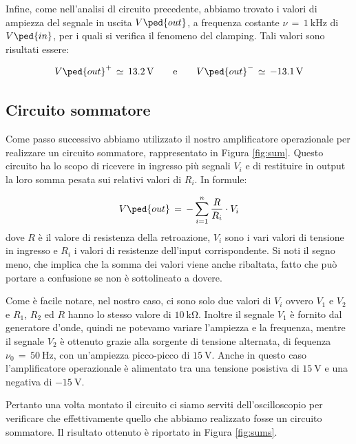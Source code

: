 Infine, come nell'analisi dl circuito precedente, abbiamo trovato i valori di ampiezza del segnale in uscita $V\ped{out}$, a frequenza costante $\nu\,=\,\SI{1}{\kilo\hertz}$ di $V\ped{in}$, per i quali si verifica il fenomeno del clamping. Tali valori sono risultati essere:

\begin{equation}
        V\ped{out}^+\,\simeq\,\SI{13.2}{\volt} \qquad \text{e} \qquad V\ped{out}^-\,\simeq\,\SI{-13.1}{\volt}
\end{equation}

\subsection*{Circuito sommatore}

Come passo successivo abbiamo utilizzato il nostro amplificatore operazionale per realizzare un circuito sommatore, rappresentato in Figura \ref{fig:sum}. Questo circuito ha lo scopo di ricevere in ingresso più segnali $V_i$ e di restituire in output la loro somma pesata sui relativi valori di $R_i$. In formule:

\begin{equation}
        V\ped{out}\,=\,-\sum_{i=1}^{n}{\frac{R}{R_i} \cdot V_i}
        \label{eq:summa}
\end{equation}
%
dove $R$ è il valore di resistenza della retroazione, $V_i$ sono i vari valori di tensione in ingresso e $R_i$ i valori di resistenze dell'input corrispondente. Si noti il segno meno, che implica che la somma dei valori viene anche ribaltata, fatto
che può portare a confusione se non è sottolineato a dovere.

Come è facile notare, nel nostro caso, ci sono solo due valori di $V_i$ ovvero $V_1$ e $V_2$ e $R_1$, $R_2$ ed $R$ hanno lo stesso valore di $\SI{10}{\kilo\ohm}$. Inoltre il segnale $V_1$ è fornito dal generatore d'onde, quindi ne potevamo variare l'ampiezza e la frequenza, mentre il segnale $V_2$ è ottenuto grazie alla sorgente di tensione alternata, di fequenza $\nu_0\,=\,\SI{50}{\hertz}$, con un'ampiezza picco-picco di $\SI{15}{\volt}$. Anche in questo caso l'amplificatore operazionale è alimentato tra una tensione posistiva di $\SI{+15}{\volt}$ e una negativa di $\SI{-15}{\volt}$.

Pertanto una volta montato il circuito ci siamo serviti dell'oscilloscopio per verificare che effettivamente quello che abbiamo realizzato fosse un circuito sommatore. Il risultato ottenuto è riportato in Figura \ref{fig:sums}.

